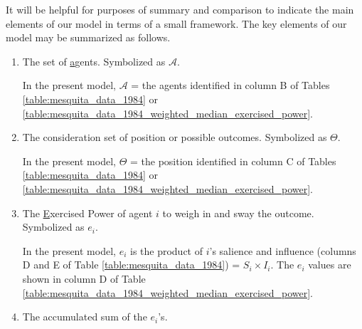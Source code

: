 It will be helpful for purposes of summary and comparison to indicate the main elements of our model in terms of a small framework.
The key elements of our model may be summarized as follows.


\begin{enumerate}
  \renewcommand{\theenumi}{\roman{enumi}}

\item The set of \underline{a}gents. Symbolized as $\mathcal{A}$.

 
 In the present model, $\mathcal{A}$ = the agents identified in column B of Tables \ref{table:mesquita_data_1984} or \ref{table:mesquita_data_1984_weighted_median_exercised_power}.
%
\item The consideration set of   {position} or  possible outcomes. Symbolized as $\Theta$.




In the present model, $\Theta$ = the   {position} identified in column C of Tables \ref{table:mesquita_data_1984} or \ref{table:mesquita_data_1984_weighted_median_exercised_power}.

\item The \underline{E}xercised Power of agent $i$ to weigh in and sway the outcome. Symbolized as $e_i$.  %

In the present model, $e_i$ is the product of $i$'s   {salience} and   {influence} (columns D and E of Table 
\ref{table:mesquita_data_1984}) = $S_i\times I_i$. The $e_i$ values are shown in column D of Table 
\ref{table:mesquita_data_1984_weighted_median_exercised_power}.

\item The accumulated sum of the $e_i$'s.


\end{enumerate}
